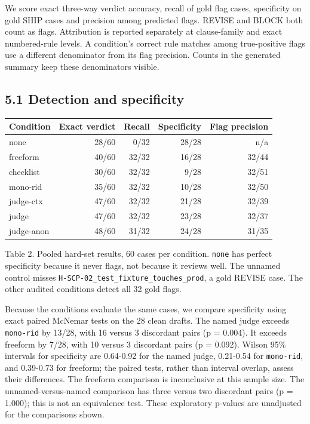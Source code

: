 \documentclass[
  10pt,
  a4paper,
]{article}
\begin{document}
We score exact three-way verdict accuracy, recall of gold flag cases,
specificity on gold SHIP cases and precision among predicted flags.
REVISE and BLOCK both count as flags. Attribution is reported separately
at clause-family and exact numbered-rule levels. A condition's correct
rule matches among true-positive flags use a different denominator from
its flag precision. Counts in the generated summary keep these
denominators visible.

\subsection{5.1 Detection and
specificity}\label{detection-and-specificity}

\begin{longtable}[]{@{}lrrrr@{}}
\toprule\noalign{}
Condition & Exact verdict & Recall & Specificity & Flag precision \\
\midrule\noalign{}
\endhead
\bottomrule\noalign{}
\endlastfoot
none & 28/60 & 0/32 & 28/28 & n/a \\
freeform & 40/60 & 32/32 & 16/28 & 32/44 \\
checklist & 30/60 & 32/32 & 9/28 & 32/51 \\
mono-rid & 35/60 & 32/32 & 10/28 & 32/50 \\
judge-ctx & 47/60 & 32/32 & 21/28 & 32/39 \\
judge & 47/60 & 32/32 & 23/28 & 32/37 \\
judge-anon & 48/60 & 31/32 & 24/28 & 31/35 \\
\end{longtable}

Table 2. Pooled hard-set results, 60 cases per condition. \texttt{none}
has perfect specificity because it never flags, not because it reviews
well. The unnamed control misses
\texttt{H-SCP-02\_test\_fixture\_touches\_prod}, a gold REVISE case. The
other audited conditions detect all 32 gold flags.

Because the conditions evaluate the same cases, we compare specificity
using exact paired McNemar tests on the 28 clean drafts. The named judge
exceeds \texttt{mono-rid} by 13/28, with 16 versus 3 discordant pairs (p
= 0.004). It exceeds freeform by 7/28, with 10 versus 3 discordant pairs
(p = 0.092). Wilson 95\% intervals for specificity are 0.64-0.92 for the
named judge, 0.21-0.54 for \texttt{mono-rid}, and 0.39-0.73 for
freeform; the paired tests, rather than interval overlap, assess their
differences. The freeform comparison is inconclusive at this sample
size. The unnamed-versus-named comparison has three versus two
discordant pairs (p = 1.000); this is not an equivalence test. These
exploratory p-values are unadjusted for the comparisons shown.
\end{document}
